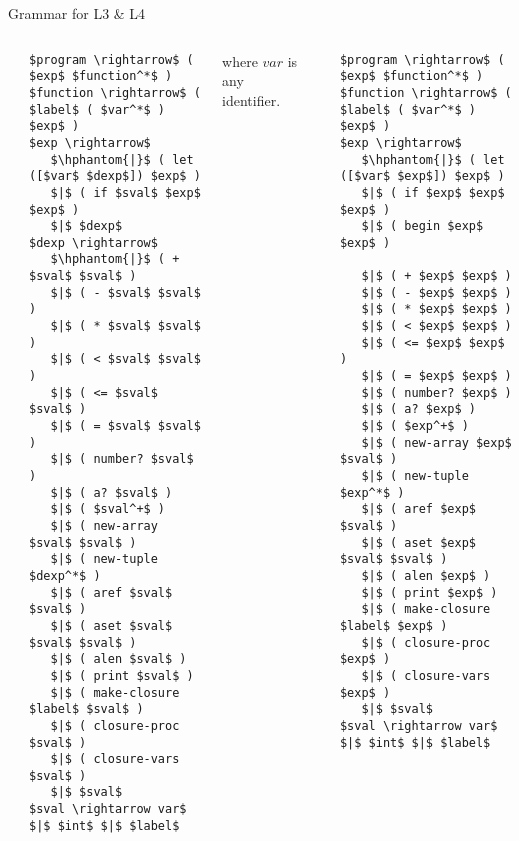 \documentclass[handout]{beamer}
\begin{document}
\begin{frame}[fragile]{Grammar for L3 \& L4}
\begin{columns}[t]
{\tiny\tt\bf{\begin{lstlisting}[mathescape]
$program \rightarrow$ ( $exp$ $function^*$ )
$function \rightarrow$ ( $label$ ( $var^*$ ) $exp$ )
$exp \rightarrow$
   $\hphantom{|}$ ( let ([$var$ $dexp$]) $exp$ )
   $|$ ( if $sval$ $exp$ $exp$ )
   $|$ $dexp$
$dexp \rightarrow$
   $\hphantom{|}$ ( + $sval$ $sval$ )
   $|$ ( - $sval$ $sval$ ) 
   $|$ ( * $sval$ $sval$ )
   $|$ ( < $sval$ $sval$ )
   $|$ ( <= $sval$ $sval$ )
   $|$ ( = $sval$ $sval$ )
   $|$ ( number? $sval$ )
   $|$ ( a? $sval$ )
   $|$ ( $sval^+$ )
   $|$ ( new-array $sval$ $sval$ )
   $|$ ( new-tuple $dexp^*$ )
   $|$ ( aref $sval$ $sval$ )
   $|$ ( aset $sval$ $sval$ $sval$ )
   $|$ ( alen $sval$ )
   $|$ ( print $sval$ )
   $|$ ( make-closure $label$ $sval$ )
   $|$ ( closure-proc $sval$ )
   $|$ ( closure-vars $sval$ )
   $|$ $sval$
$sval \rightarrow var$ $|$ $int$ $|$ $label$
\end{lstlisting}}}

where $var$ is any identifier.

{\tiny\tt\bf{\begin{lstlisting}[mathescape]
$program \rightarrow$ ( $exp$ $function^*$ )
$function \rightarrow$ ( $label$ ( $var^*$ ) $exp$ )
$exp \rightarrow$
   $\hphantom{|}$ ( let ([$var$ $exp$]) $exp$ )
   $|$ ( if $exp$ $exp$ $exp$ )
   $|$ ( begin $exp$ $exp$ )

   $|$ ( + $exp$ $exp$ )
   $|$ ( - $exp$ $exp$ ) 
   $|$ ( * $exp$ $exp$ )
   $|$ ( < $exp$ $exp$ )
   $|$ ( <= $exp$ $exp$ )
   $|$ ( = $exp$ $exp$ )
   $|$ ( number? $exp$ )
   $|$ ( a? $exp$ )
   $|$ ( $exp^+$ )
   $|$ ( new-array $exp$ $sval$ )
   $|$ ( new-tuple $exp^*$ )
   $|$ ( aref $exp$ $sval$ )
   $|$ ( aset $exp$ $sval$ $sval$ )
   $|$ ( alen $exp$ )
   $|$ ( print $exp$ )
   $|$ ( make-closure $label$ $exp$ )
   $|$ ( closure-proc $exp$ )
   $|$ ( closure-vars $exp$ )
   $|$ $sval$
$sval \rightarrow var$ $|$ $int$ $|$ $label$
\end{lstlisting}}}

\end{columns}
\end{frame}
\end{document}

